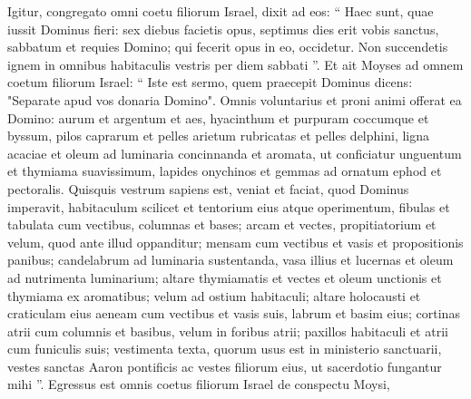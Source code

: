 \begin{biblechapter}
\begin{biblechapter}
\begin{biblechapter}
\begin{biblechapter}
\begin{biblechapter}
\begin{biblechapter}
\begin{biblechapter}
\begin{biblechapter}
\begin{biblechapter}
\begin{biblechapter}
\begin{biblechapter}
\begin{biblechapter}
\begin{biblechapter}
\begin{biblechapter}
\begin{biblechapter}
\begin{biblechapter}
\begin{biblechapter}
\begin{biblechapter}
\begin{biblechapter}
\begin{biblechapter}
\begin{biblechapter}
\begin{biblechapter}
\begin{biblechapter}
\begin{biblechapter}
\begin{biblechapter}
\begin{biblechapter}
\begin{biblechapter}
\begin{biblechapter}
\begin{biblechapter}
\begin{biblechapter}
\begin{biblechapter}
\begin{biblechapter}
\begin{biblechapter}
\begin{biblechapter}
\begin{biblechapter}
\verse Igitur, congregato omni coetu filiorum Israel, dixit ad eos: “ Haec sunt, quae iussit Dominus fieri: 
\verse sex diebus facietis opus, septimus dies erit vobis sanctus, sabbatum et requies Domino; qui fecerit opus in eo, occidetur. 
 \verse Non succendetis ignem in omnibus habitaculis vestris per diem sabbati ”.
 \verse Et ait Moyses ad omnem coetum filiorum Israel: “ Iste est sermo, quem praecepit Dominus dicens: 
\verse "Separate apud vos donaria Domino". Omnis voluntarius et proni animi offerat ea Domino: aurum et argentum et aes, 
\verse hyacinthum et purpuram coccumque et byssum, pilos caprarum 
\verse et pelles arietum rubricatas et pelles delphini, ligna acaciae 
\verse et oleum ad luminaria concinnanda et aromata, ut conficiatur unguentum et thymiama suavissimum, 
\verse lapides onychinos et gemmas ad ornatum ephod et pectoralis.
 \verse Quisquis vestrum sapiens est, veniat et faciat, quod Dominus imperavit, 
 \verse habitaculum scilicet et tentorium eius atque operimentum, fibulas et tabulata cum vectibus, columnas et bases; 
\verse arcam et vectes, propitiatorium et velum, quod ante illud oppanditur; 
\verse mensam cum vectibus et vasis et propositionis panibus; 
\verse candelabrum ad luminaria sustentanda, vasa illius et lucernas et oleum ad nutrimenta luminarium; 
\verse altare thymiamatis et vectes et oleum unctionis et thymiama ex aromatibus; velum ad ostium habitaculi; 
 \verse altare holocausti et craticulam eius aeneam cum vectibus et vasis suis, labrum et basim eius; 
\verse cortinas atrii cum columnis et basibus, velum in foribus atrii; 
\verse paxillos habitaculi et atrii cum funiculis suis; 
\verse vestimenta texta, quorum usus est in ministerio sanctuarii, vestes sanctas Aaron pontificis ac vestes filiorum eius, ut sacerdotio fungantur mihi ”.
 \verse Egressus est omnis coetus filiorum Israel de conspectu Moysi, 

\end{biblechapter}
\end{biblechapter}
\end{biblechapter}
\end{biblechapter}
\end{biblechapter}
\end{biblechapter}
\end{biblechapter}
\end{biblechapter}
\end{biblechapter}
\end{biblechapter}
\end{biblechapter}
\end{biblechapter}
\end{biblechapter}
\end{biblechapter}
\end{biblechapter}
\end{biblechapter}
\end{biblechapter}
\end{biblechapter}
\end{biblechapter}
\end{biblechapter}
\end{biblechapter}
\end{biblechapter}
\end{biblechapter}
\end{biblechapter}
\end{biblechapter}
\end{biblechapter}
\end{biblechapter}
\end{biblechapter}
\end{biblechapter}
\end{biblechapter}
\end{biblechapter}
\end{biblechapter}
\end{biblechapter}
\end{biblechapter}
\end{biblechapter}
